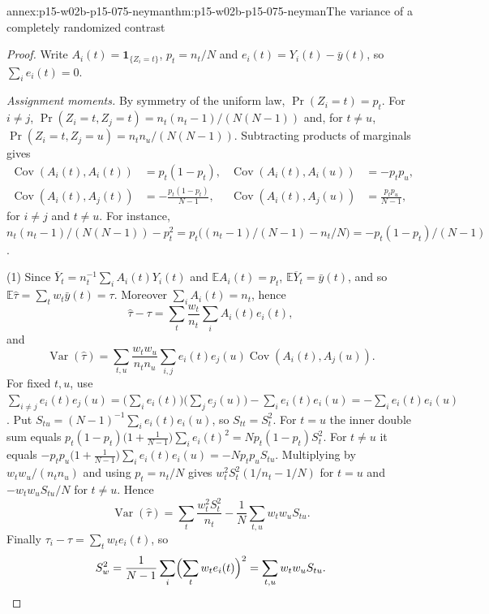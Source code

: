 \begin{annexitem}{annex:p15-w02b-p15-075-neyman}{thm:p15-w02b-p15-075-neyman}{The variance of a completely randomized contrast}
\begin{proof}
Write \(A_i(t)=\mathbf1_{\{Z_i=t\}}\), \(p_t=n_t/N\) and
\(e_i(t)=Y_i(t)-\bar y(t)\), so \(\sum_ie_i(t)=0\).

\emph{Assignment moments.} By symmetry of the uniform law, \(\Pr(Z_i=t)=p_t\).
For \(i\neq j\), \(\Pr(Z_i=t,Z_j=t)=n_t(n_t-1)/(N(N-1))\) and, for
\(t\neq u\), \(\Pr(Z_i=t,Z_j=u)=n_tn_u/(N(N-1))\). Subtracting products
of marginals gives
\[
\begin{aligned}
 \operatorname{Cov}(A_i(t),A_i(t))&=p_t(1-p_t), &
 \operatorname{Cov}(A_i(t),A_i(u))&=-p_tp_u,\\
 \operatorname{Cov}(A_i(t),A_j(t))&=-\frac{p_t(1-p_t)}{N-1}, &
 \operatorname{Cov}(A_i(t),A_j(u))&=\frac{p_tp_u}{N-1},
\end{aligned}
\]
for \(i\neq j\) and \(t\neq u\). For instance,
\(n_t(n_t-1)/(N(N-1))-p_t^2=p_t\bigl((n_t-1)/(N-1)-n_t/N\bigr)
=-p_t(1-p_t)/(N-1)\).

(1) Since \(\overline Y_t=n_t^{-1}\sum_iA_i(t)Y_i(t)\) and
\(\mathbb EA_i(t)=p_t\), \(\mathbb E\overline Y_t=\bar y(t)\), and so
\(\mathbb E\widehat\tau=\sum_tw_t\bar y(t)=\tau\). Moreover
\(\sum_iA_i(t)=n_t\), hence
\[
 \widehat\tau-\tau=\sum_t\frac{w_t}{n_t}\sum_iA_i(t)e_i(t),
\]
and
\[
 \operatorname{Var}(\widehat\tau)=\sum_{t,u}\frac{w_tw_u}{n_tn_u}
 \sum_{i,j}e_i(t)e_j(u)\operatorname{Cov}(A_i(t),A_j(u)).
\]
For fixed \(t,u\), use \(\sum_{i\neq j}e_i(t)e_j(u)
=\bigl(\sum_ie_i(t)\bigr)\bigl(\sum_je_j(u)\bigr)-\sum_ie_i(t)e_i(u)
=-\sum_ie_i(t)e_i(u)\). Put
\(S_{tu}=(N-1)^{-1}\sum_ie_i(t)e_i(u)\), so \(S_{tt}=S_t^2\). For
\(t=u\) the inner double sum equals
\(p_t(1-p_t)\bigl(1+\tfrac1{N-1}\bigr)\sum_ie_i(t)^2=Np_t(1-p_t)S_t^2\).
For \(t\neq u\) it equals
\(-p_tp_u\bigl(1+\tfrac1{N-1}\bigr)\sum_ie_i(t)e_i(u)=-Np_tp_uS_{tu}\).
Multiplying by \(w_tw_u/(n_tn_u)\) and using \(p_t=n_t/N\) gives
\(w_t^2S_t^2(1/n_t-1/N)\) for \(t=u\) and \(-w_tw_uS_{tu}/N\) for
\(t\neq u\). Hence
\[
 \operatorname{Var}(\widehat\tau)=\sum_t\frac{w_t^2S_t^2}{n_t}
 -\frac1N\sum_{t,u}w_tw_uS_{tu}.
\]
Finally \(\tau_i-\tau=\sum_tw_te_i(t)\), so
\[
 S_w^2=\frac1{N-1}\sum_i\Bigl(\sum_tw_te_i(t)\Bigr)^2=\sum_{t,u}w_tw_uS_{tu}.
\]


\end{proof}
\end{annexitem}
